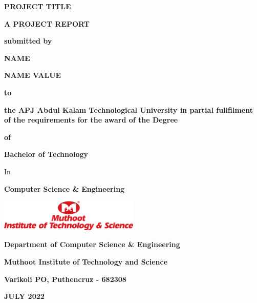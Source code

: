 \begin{titlepage}
    \addtolength{\hoffset}{0cm}
    \centering
    {\scshape\large \bfseries PROJECT TITLE \par}
    \vspace{1cm}
    {\scshape \bfseries A PROJECT REPORT \par}
    \vspace{0.5cm}
    {\small \bfseries submitted by \par}
    \vspace{0.5cm}
    {\large \bfseries NAME \par}
    {\large \bfseries NAME VALUE \par}
    \vspace{0.5cm}
    {\small \bfseries to \par}
    \vspace{0.5cm}
    {\small \bfseries  the APJ Abdul Kalam Technological University in partial fullfilment of the requirements for the award of the Degree \par}
    \vspace{0.5cm}
    {\small \bfseries of \par}
    \vspace{0.5cm}
    {\bfseries Bachelor of Technology\par}
    { In \par}
    {\bfseries Computer Science \& Engineering \par}
    \vspace{1cm}
    \includegraphics[width=0.50\textwidth]{images/MITS.png}\par\vspace{1cm}
    {\bfseries Department of Computer Science \& Engineering\par}
    {\bfseries Muthoot Institute of Technology and Science\par}
    {\bfseries Varikoli PO, Puthencruz - 682308 \par}
    \vspace{1cm}
    {\bfseries JULY 2022 \par}
\end{titlepage}